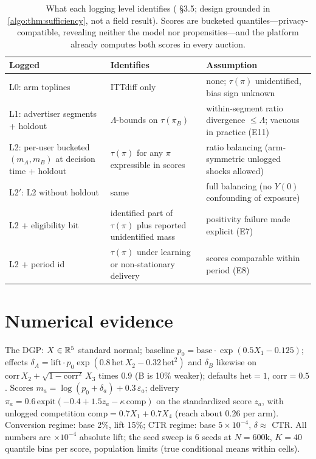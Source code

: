 \begin{table}[htbp]
\centering\small
\caption{What each logging level identifies ( \S3.5; design grounded in \cref{algo:thm:sufficiency}, not a field result). Scores are bucketed quantiles---privacy-compatible, revealing neither the model nor propensities---and the platform already computes both scores in every auction.}
\label{algo:tab:hierarchy}
\begin{tabularx}{\textwidth}{lXX}
\toprule
Logged & Identifies & Assumption \\
\midrule
L0: arm toplines & ITTdiff only & none; $\tau(\pi)$ unidentified, bias sign unknown \\
L1: advertiser segments + holdout & $\Lambda$-bounds on $\tau(\pi_B)$ & within-segment ratio divergence $\le \Lambda$; vacuous in practice (E11) \\
L2: per-user bucketed $(m_A, m_B)$ at decision time + holdout & $\tau(\pi)$ for any $\pi$ expressible in scores & ratio balancing (arm-symmetric unlogged shocks allowed) \\
L2$'$: L2 without holdout & same & full balancing (no $Y(0)$ confounding of exposure) \\
L2 + eligibility bit & identified part of $\tau(\pi)$ plus reported unidentified mass & positivity failure made explicit (E7) \\
L2 + period id & $\tau(\pi)$ under learning or non-stationary delivery & scores comparable within period (E8) \\
\bottomrule
\end{tabularx}
\end{table}

\section{Numerical evidence}
\label{algo:sec:numerics}

The DGP: $X \in \mathbb{R}^5$ standard normal; baseline $p_0 = \mathrm{base}\cdot\exp(0.5X_1 - 0.125)$; effects $\delta_A = \mathrm{lift}\cdot p_0\exp(0.8\,\mathrm{het}\,X_2 - 0.32\,\mathrm{het}^2)$ and $\delta_B$ likewise on $\mathrm{corr}\,X_2 + \sqrt{1-\mathrm{corr}^2}\,X_3$ times 0.9 (B is 10\% weaker); defaults $\mathrm{het} = 1$, $\mathrm{corr} = 0.5$. Scores $m_a = \log(p_0 + \delta_a) + 0.3\,\varepsilon_a$; delivery $\pi_a = 0.6\,\mathrm{expit}(-0.4 + 1.5z_a - \kappa\,\mathrm{comp})$ on the standardized score $z_a$, with unlogged competition $\mathrm{comp} = 0.7X_1 + 0.7X_4$ (reach about 0.26 per arm). Conversion regime: base 2\%, lift 15\%; CTR regime: base $5\times10^{-4}$, $\delta \approx$ CTR. All numbers are $\times10^{-4}$ absolute lift; the seed sweep is 6 seeds at $N = 600$k, $K = 40$ quantile bins per score, population limits (true conditional means within cells).

